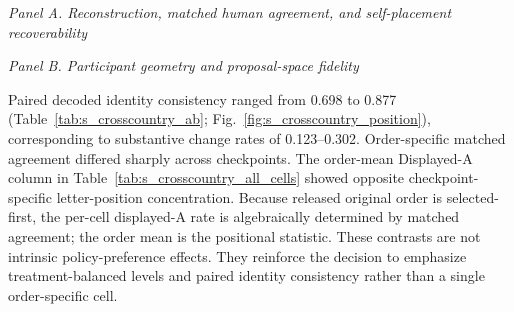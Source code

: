 \documentclass[unnumsec,webpdf,modern,large]{oup-authoring-template}
\begin{document}
\begin{table}[p]
\caption{Primary confirmed-adult C20 treatment-balanced results. Estimates give equal weight to self-placement present/ablated and original/inverted cells. Human-reference rows report national DYNAMAP point diagnostics; matched-agreement confidence intervals resample complete UUID histories 2,000 times. Self-pl. is held-out left--right self-placement classification accuracy; $\Delta$ coord. is its gain over the sociodemographic model. For the human-reference rows, Self-pl. and $\Delta$ coord. are computed from the human DYNAMAP coordinates under the same random forest, fixed holdout, and sociodemographic baseline as the synthetic rows. L--R and Var. are fractions of the corresponding national human geometry; $r_{dist}$ is the within-country proposal-distance correlation; and $\rho_{BT}$ is the Bradley--Terry rank correlation with the national human ranking. Human-reference rows in Panel B are 1.000 by definition. French and Brazilian C20 majority rules are 0.810 and 0.786, respectively; raw self-placement accuracy should be read with Table~\ref{tab:s_crosscountry_classification}.}
\label{tab:s_crosscountry_c20}
\centering
\footnotesize
\textit{Panel A. Reconstruction, matched human agreement, and self-placement recoverability}\par\smallskip
\resizebox{\textwidth}{!}{}
\medskip

\textit{Panel B. Participant geometry and proposal-space fidelity}\par\smallskip

\end{table}

Paired decoded identity consistency ranged from 0.698 to 0.877 (Table~\ref{tab:s_crosscountry_ab}; Fig.~\ref{fig:s_crosscountry_position}), corresponding to substantive change rates of 0.123--0.302. Order-specific matched agreement differed sharply across checkpoints. The order-mean Displayed-A column in Table~\ref{tab:s_crosscountry_all_cells} showed opposite checkpoint-specific letter-position concentration. Because released original order is selected-first, the per-cell displayed-A rate is algebraically determined by matched agreement; the order mean is the positional statistic. These contrasts are not intrinsic policy-preference effects. They reinforce the decision to emphasize treatment-balanced levels and paired identity consistency rather than a single order-specific cell.
\end{document}
